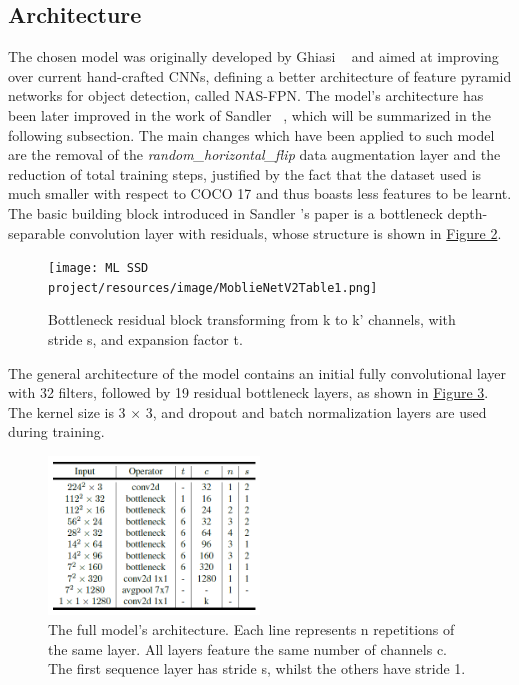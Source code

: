 \documentclass[10pt,twocolumn,letterpaper]{article}
\begin{document}
\subsection{Architecture}
\begin{flushleft}
The chosen model was originally developed by Ghiasi \etal~\cite{ghiasi2019nasfpn} and aimed at improving over current hand-crafted CNNs, defining a better architecture of feature pyramid networks for object detection, called NAS-FPN.
The model's architecture has been later improved in the work of Sandler \etal~\cite{sandler2019mobilenetv2}, which will be summarized in the following subsection.
The main changes which have been applied to such model are the removal of the \textit{random\_horizontal\_flip} data augmentation layer and the reduction of total training steps, justified by the fact that the dataset used is much smaller with respect to COCO 17 and thus boasts less features to be learnt.\linebreak
The basic building block introduced in Sandler \etal's paper is a bottleneck depth-separable convolution layer with residuals, whose structure is shown in \hyperref[figure2]{Figure 2}.

\begin{figure}[!h]
    \centering
    \texttt{[image: ML SSD project/resources/image/MoblieNetV2Table1.png]} \caption{Bottleneck residual block transforming from k to k' channels, with stride s, and expansion factor t.}
\end{figure}
\label{figure2}

The general architecture of the model contains an initial fully convolutional layer with 32 filters, followed by 19 residual bottleneck layers, as shown in \hyperref[figure3]{Figure 3}. The kernel size is 3 × 3, and dropout and batch normalization layers are used during training.

\begin{figure}[!h]
    \centering
    \includegraphics[width=0.5\textwidth]{resources/image/MoblieNetV2Table2.png} \caption{The full model's architecture. Each line represents n repetitions of the same layer. All layers feature the same number of channels c. The first sequence layer has stride s, whilst the others have stride 1.}
\end{figure}
\label{figure3}


\end{flushleft}
\end{document}
